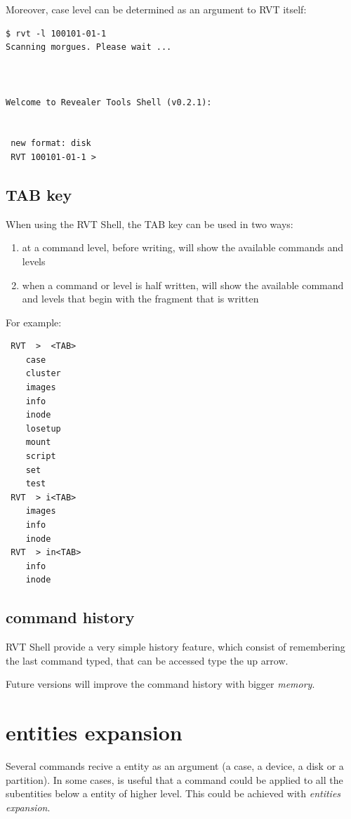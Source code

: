 \documentclass[a4paper,11pt,oneside]{report}
\begin{document}
Moreover, case level can be determined as an argument to RVT itself:

\begin{verbatim}
$ rvt -l 100101-01-1
Scanning morgues. Please wait ...



Welcome to Revealer Tools Shell (v0.2.1):


 new format: disk
 RVT 100101-01-1 >  
\end{verbatim}



\subsection{TAB key}

When using the RVT Shell, the TAB key can be used in two ways:

\begin{enumerate}
\item at a command level, before writing, will show the available commands and levels
\item when a command or level is half written, will show the available command and levels that begin with the fragment that is written
\end{enumerate}

For example:

\begin{verbatim}
 RVT  >  <TAB>	
	case
	cluster
	images
	info
	inode
	losetup
	mount
	script
	set
	test
 RVT  > i<TAB>	
	images
	info
	inode
 RVT  > in<TAB>	
	info
	inode
\end{verbatim}


\subsection{command history}

RVT Shell provide a very simple history feature, which consist of remembering the last command typed, that can be accessed type the up arrow.

Future versions will improve the command history with bigger \emph{memory}.






\section{entities expansion}

Several commands recive a entity as an argument (a case, a device, a disk or a partition).  In some cases, is useful that a command could be applied to all the subentities below a entity of higher level. This could be achieved with \emph{entities expansion}.
\end{document}
